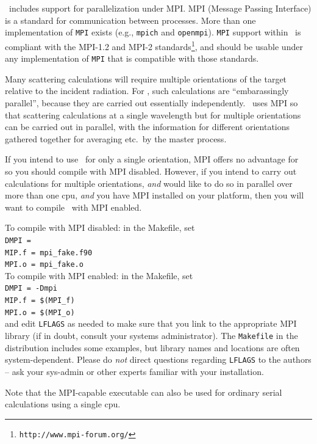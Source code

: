 \ddscatv\ includes support for parallelization under MPI.
MPI (Message Passing Interface) is a standard for communication between
processes.
More than one implementation of {\tt MPI} exists (e.g., {\tt mpich}
and {\tt openmpi}).  
{\tt MPI} support within \ddscatv\ is compliant with the MPI-1.2 and MPI-2
standards\footnote{\tt http://www.mpi-forum.org/}, 
and should be usable under any implementation of {\tt MPI}
that is compatible with those standards.


Many scattering calculations will require multiple orientations of the
target relative to the incident radiation.  For \ddscatv, such
calculations are  ``embarassingly parallel'', because they are carried
out essentially independently.  \ddscatv\ uses MPI so that scattering
calculations at a single wavelength but for multiple orientations can
be carried out in parallel, with the information for different orientations
gathered together for averaging etc.\ by the master process.  

If you intend
to use \ddscatv\ for only a single orientation, MPI offers no advantage
for \ddscatv\, so you should compile with MPI disabled.
However, if you intend to carry out calculations for multiple orientations,
{\it and} would like to do so in parallel over more than one cpu, {\it and}
you have MPI installed on your platform, then you will want to compile
\ddscatv\ with MPI enabled.
  
To compile with MPI disabled: in the Makefile, set\\
       {\tt DMPI  =}\\
       {\tt MIP.f = mpi\_fake.f90}\\
       {\tt MPI.o = mpi\_fake.o}\\
To compile with MPI enabled: in the Makefile, set\\
       {\tt DMPI  = -Dmpi}\\
       {\tt MIP.f = \$(MPI\_f)}\\
       {\tt MPI.o = \$(MPI\_o)}\\
and edit {\tt LFLAGS} as needed to make sure that you link to the
appropriate MPI library (if in doubt, consult your systems administrator).
The {\tt Makefile} in the distribution includes some examples, but 
library names and locations are often system-dependent.
Please do {\it not} direct questions regarding {\tt LFLAGS} to the authors --
ask your sys-admin or other experts familiar with your installation.

Note that the MPI-capable executable can also be used for ordinary serial 
calculations using a single cpu.

